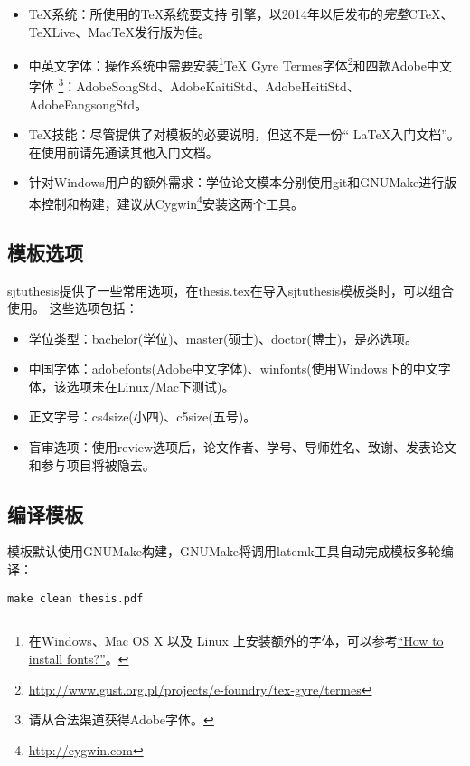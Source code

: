 \begin{itemize}[noitemsep,topsep=0pt,parsep=0pt,partopsep=0pt]
	\item {\TeX}系统：所使用的{\TeX}系统要支持 \XeTeX 引擎，以2014年以后发布的\emph{完整}CTeX、TeXLive、MacTeX发行版为佳。
	\item 中英文字体：操作系统中需要安装\footnote{在Windows、Mac OS X 以及 Linux 上安装额外的字体，可以参考\href{https://www.searchfreefonts.com/articles/how-to-install-fonts.htm}{“How to install fonts?”}。
}TeX Gyre Termes字体\footnote{\url{http://www.gust.org.pl/projects/e-foundry/tex-gyre/termes}}和四款Adobe中文字体
\footnote{请从合法渠道获得Adobe字体。}：AdobeSongStd、AdobeKaitiStd、AdobeHeitiStd、AdobeFangsongStd。
	\item TeX技能：尽管提供了对模板的必要说明，但这不是一份“ \LaTeX 入门文档”。在使用前请先通读其他入门文档。
	\item 针对Windows用户的额外需求：学位论文模本分别使用git和GNUMake进行版本控制和构建，建议从Cygwin\footnote{\url{http://cygwin.com}}安装这两个工具。
\end{itemize}

\subsection{模板选项}
\label{sec:thesisoption}

sjtuthesis提供了一些常用选项，在thesis.tex在导入sjtuthesis模板类时，可以组合使用。
这些选项包括：

\begin{itemize}[noitemsep,topsep=0pt,parsep=0pt,partopsep=0pt]
\item 学位类型：bachelor(学位)、master(硕士)、doctor(博士)，是必选项。
\item 中国字体：adobefonts(Adobe中文字体)、winfonts(使用Windows下的中文字体，该选项未在Linux/Mac下测试)。
\item 正文字号：cs4size(小四)、c5size(五号)。
\item 盲审选项：使用review选项后，论文作者、学号、导师姓名、致谢、发表论文和参与项目将被隐去。
\end{itemize}

\subsection{编译模板}
\label{sec:process}

模板默认使用GNUMake构建，GNUMake将调用latemk工具自动完成模板多轮编译：

\begin{lstlisting}[basicstyle=\small\ttfamily, caption={编译模板}, numbers=none]
make clean thesis.pdf
\end{lstlisting}

